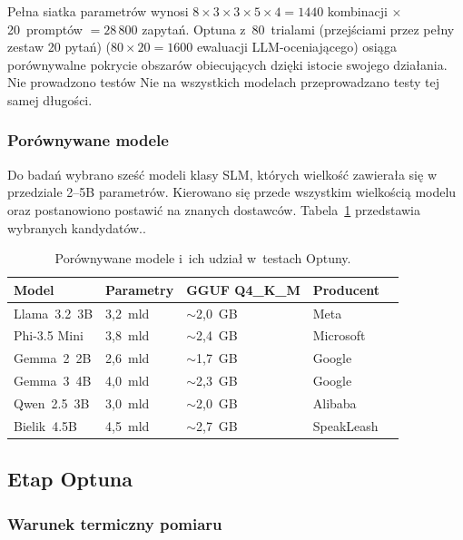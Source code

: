 Pełna siatka parametrów wynosi $8 \times 3 \times 3 \times 5 \times 4
= 1440$ kombinacji $\times$ 20~promptów $= 28\,800$ zapytań. Optuna z~80~trialami (przejściami przez pełny zestaw 20 pytań)
($80 \times 20 = 1600$ ewaluacji LLM-oceniającego) osiąga porównywalne pokrycie
obszarów obiecujących dzięki istocie swojego działania. Nie prowadzono testów Nie na wszystkich modelach przeprowadzano testy tej samej długości.

\subsubsection{Porównywane modele}

Do badań wybrano sześć modeli klasy SLM, których wielkość zawierała się w przedziale  2--5B parametrów. Kierowano się przede wszystkim wielkością modelu oraz postanowiono postawić na znanych dostawców. Tabela~\ref{tab:modele_kandydaci}
przedstawia wybranych kandydatów..

\begin{table}[H]
  \centering
  \caption{Porównywane modele i~ich udział w~testach Optuny.}
  \label{tab:modele_kandydaci}
  \small
  \begin{tabular}{lllll}
    \hline
    Model & Parametry & GGUF Q4\_K\_M & Producent \\
    \hline
    Llama~3.2~3B  & 3{,}2~mld & ${\sim}$2{,}0~GB & Meta        \\
    Phi-3.5 Mini  & 3{,}8~mld & ${\sim}$2{,}4~GB & Microsoft  \\
    Gemma~2~2B    & 2{,}6~mld & ${\sim}$1{,}7~GB & Google     \\
    Gemma~3~4B    & 4{,}0~mld & ${\sim}$2{,}3~GB & Google     \\
    Qwen~2.5~3B   & 3{,}0~mld & ${\sim}$2{,}0~GB & Alibaba    \\
    Bielik~4.5B   & 4{,}5~mld & ${\sim}$2{,}7~GB & SpeakLeash \\
    \hline
  \end{tabular}
\end{table}


\subsection{Etap Optuna}
\label{subsec:optuna}

\subsubsection{Warunek termiczny pomiaru}
\label{subsec:run1}
\label{subsec:run2}

